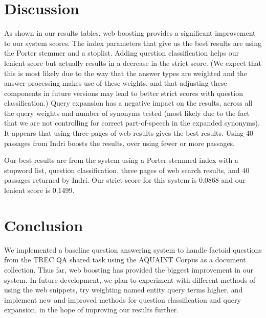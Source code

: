 \documentclass[11pt]{article}
\begin{document}
\section{Discussion}

As shown in our results tables, web boosting provides a significant improvement to our system scores.  The index parameters that give us the best results are using the Porter stemmer and a stoplist.  Adding question classification helps our lenient score but actually results in a decrease in the strict score. (We expect that this is most likely due to the way that the answer types are weighted and the answer-processing makes use of these weights, and that adjusting these components in future versions may lead to better strict scores with question classification.)  Query expansion has a negative impact on the results, across all the query weights and number of synonyms tested (most likely due to the fact that we are not controlling for correct part-of-speech in the expanded synonyms).  It appears that using three pages of web results gives the best results.  Using 40 passages from Indri boosts the results, over using fewer or more passages.

Our best results are from the system using a Porter-stemmed index with a stopword list, question classification, three pages of web search results, and 40 passages returned by Indri.  Our strict score for this system is 0.0868 and our lenient score is 0.1499.

\section{Conclusion}

We implemented a baseline question answering system to handle factoid questions from the TREC QA shared task using the AQUAINT Corpus as a document collection. Thus far, web boosting has provided the biggest improvement in our system. In future development, we plan to experiment with different methods of using the web snippets, try weighting named entity query terms higher, and implement new and improved methods for question classification and query expansion, in the hope of improving our results further.

\nocite{*}




\end{document}
